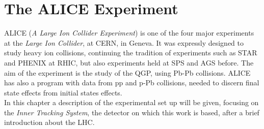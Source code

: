 \chapter{The ALICE Experiment}
ALICE (\textit{A Large Ion Collider Experiment}) is one of the four major experiments at the \textit{Large Ion Collider}, at CERN, in Geneva. It was expressly designed to study heavy ion collisions, continuing the tradition of experiments such as STAR and PHENIX at RHIC, but also experiments held at SPS and AGS before. The aim of the experiment is the study of the QGP, using Pb-Pb collisions. ALICE has also a program with data from pp and p-Pb collisions, needed to discern final state effects from initial states effects.\\
In this chapter a description of the experimental set up will be given, focusing on the \textit{Inner Tracking System}, the detector on which this work is based, after a brief introduction about the LHC.

